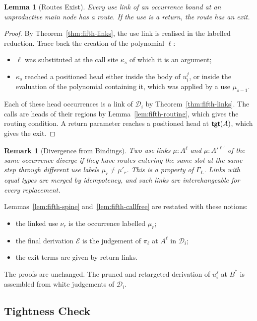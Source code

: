 \documentclass[10pt,a4paper]{article}
\theoremstyle{plain}%
\newtheorem{lemma}[theorem]{Lemma}
\newtheorem{remark}[theorem]{Remark}
\begin{document}
\begin{lemma}[Routes Exist]\label{lem:fifth-routes}
Every use link of an occurrence bound at an unproductive main node has a route.
If the use is a return, the route has an exit.
\end{lemma}

\begin{proof}
By Theorem~\ref{thm:fifth-links}, the use link is realised in the labelled reduction.
Trace back the creation of the polynomial $\ell$:
\begin{itemize}
\item $\ell$ was substituted at the call site $\kappa_s$ of which it is an argument;
\item $\kappa_s$ reached a positioned head either inside the body of $u_i^j$, or inside the evaluation of the polynomial containing it, which was applied by a use $\mu_{s-1}$.
\end{itemize}
Each of these head occurrences is a link of $\mathcal{D}_i$ by Theorem~\ref{thm:fifth-links}.
The calls are heads of their regions by Lemma~\ref{lem:fifth-routing}, which gives the routing condition.
A return parameter reaches a positioned head at $\mathsf{tgt}(A)$, which gives the exit.
\end{proof}

\begin{remark}[Divergence from Bindings]
Two use links $\mu : A^\ell$ and $\mu : A'^{\ell'}$ of the same occurrence \emph{diverge} if they have routes entering the same slot at the same step through different use labels $\mu_r \neq \mu'_r$.
This is a property of $\Gamma_L$.
Links with equal types are merged by idempotency, and such links are interchangeable for every replacement.
\end{remark}

Lemmas~\ref{lem:fifth-spine} and~\ref{lem:fifth-callfree} are restated with these notions:
\begin{itemize}
\item the linked use $\nu_r$ is the occurrence labelled $\mu_r$;
\item the final derivation $\mathcal{E}$ is the judgement of $\pi_\ell$ at $A^\ell$ in $\mathcal{D}_i$;
\item the exit terms are given by return links.
\end{itemize}
The proofs are unchanged.
The pruned and retargeted derivation of $u_i^j$ at $B^*$ is assembled from white judgements of $\mathcal{D}_i$.

\subsection{Tightness Check}
\label{sec:fifth-tight}
\end{document}
